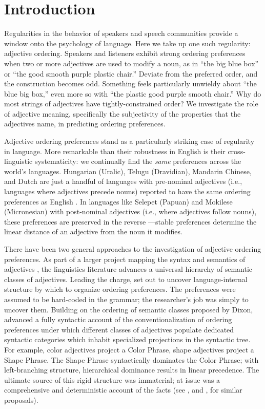 \documentclass[manuscript]{stjour}
\begin{document}
\section{Introduction}

Regularities in the behavior of speakers and speech communities provide a window onto the psychology of language. Here we take up one such regularity: adjective ordering. Speakers and listeners exhibit strong ordering preferences when two or more adjectives are used to modify a noun, as in ``the big blue box'' or ``the good smooth purple plastic chair.'' Deviate from the preferred order, and the construction becomes odd. Something feels particularly unwieldy about ``the blue big box,'' even more so with ``the plastic good purple smooth chair.'' 
Why do most strings of adjectives have tightly-constrained order? 
We investigate the role of adjective meaning, specifically the subjectivity of the properties that the adjectives name, in predicting ordering preferences.

Adjective ordering preferences stand as a particularly striking case of regularity in language. More remarkable than their robustness in English is their cross-linguistic systematicity: we continually find the \emph{same} preferences across the world's languages. Hungarian (Uralic), Telugu (Dravidian), Mandarin Chinese, and Dutch are just a handful of languages with pre-nominal adjectives (i.e., languages where adjectives precede nouns) reported to have the same ordering preferences as English \citep{Martin1969a,hetzron1978,dixon1982,Sproat1991,LaPolla2004}.  In languages like Selepet (Papuan) and Mokilese (Micronesian) with post-nominal adjectives (i.e., where adjectives follow nouns), these preferences are preserved in the reverse \citep{hetzron1978,dixon1982,Sproat1991}---stable preferences determine the linear distance of an adjective from the noun it modifies.

There have been two general approaches to the investigation of adjective ordering preferences. 
As part of a larger project mapping the syntax and semantics of adjectives%
, the linguistics literature advances a universal hierarchy of semantic classes of adjectives. Leading the charge, \citet{dixon1982} set out to uncover language-internal structure by which to organize ordering preferences. The preferences were assumed to be hard-coded in the grammar; the researcher's job was simply to uncover them. 
Building on the ordering of semantic classes proposed by Dixon, \cite{Cinque1994} advanced a fully syntactic account of the conventionalization of ordering preferences under which different classes of adjectives populate dedicated syntactic categories which inhabit specialized projections in the syntactic tree. For example, color adjectives project a Color Phrase, shape adjectives project a Shape Phrase. The Shape Phrase syntactically dominates the Color Phrase; with left-branching structure, hierarchical dominance results in linear precedence. The ultimate source of this rigid structure was immaterial; at issue was a comprehensive and deterministic account of the facts (see \citealp{scott2002}, and \citealp{laenzlinger2005}, for similar proposals). 
\end{document}
